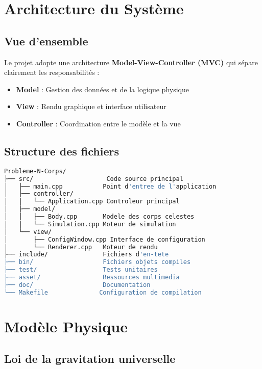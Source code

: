 \documentclass[12pt,a4paper]{article}
\begin{document}
\section{Architecture du Système}

\subsection{Vue d'ensemble}

Le projet adopte une architecture \textbf{Model-View-Controller (MVC)} qui sépare clairement les responsabilités :

\begin{itemize}
    \item \textbf{Model} : Gestion des données et de la logique physique
    \item \textbf{View} : Rendu graphique et interface utilisateur
    \item \textbf{Controller} : Coordination entre le modèle et la vue
\end{itemize}

\subsection{Structure des fichiers}

\begin{lstlisting}[language=bash, caption=Structure du projet]
Probleme-N-Corps/
├── src/                    Code source principal
│   ├── main.cpp           Point d'entree de l'application
│   ├── controller/
│   │   └── Application.cpp Controleur principal
│   ├── model/
│   │   ├── Body.cpp       Modele des corps celestes
│   │   └── Simulation.cpp Moteur de simulation
│   └── view/
│       ├── ConfigWindow.cpp Interface de configuration
│       └── Renderer.cpp   Moteur de rendu
├── include/               Fichiers d'en-tete
├── bin/                   Fichiers objets compiles
├── test/                  Tests unitaires
├── asset/                 Ressources multimedia
├── doc/                   Documentation
└── Makefile              Configuration de compilation
\end{lstlisting}

\section{Modèle Physique}

\subsection{Loi de la gravitation universelle}
\end{document}
